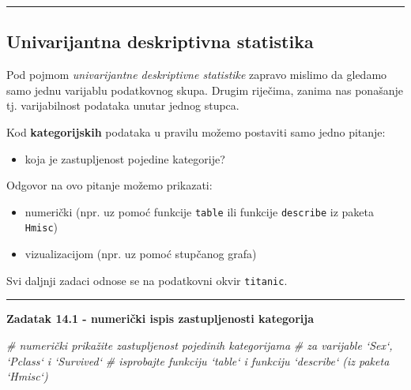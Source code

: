 \documentclass[]{book}
\newenvironment{Shaded}{\begin{snugshade}}{\end{snugshade}}
\newcommand{\CommentTok}[1]{\textcolor[rgb]{0.56,0.35,0.01}{\textit{#1}}}
\providecommand{\tightlist}{%
  \setlength{\itemsep}{0pt}\setlength{\parskip}{0pt}}
\theoremstyle{definition}
\theoremstyle{definition}
\theoremstyle{definition}
\theoremstyle{remark}
\begin{document}
\begin{center}\rule{0.5\linewidth}{\linethickness}\end{center}

\subsection{Univarijantna deskriptivna
statistika}\label{univarijantna-deskriptivna-statistika}

Pod pojmom \emph{univarijantne deskriptivne statistike} zapravo mislimo
da gledamo samo jednu varijablu podatkovnog skupa. Drugim riječima,
zanima nas ponašanje tj. varijabilnost podataka unutar jednog stupca.

Kod \textbf{kategorijskih} podataka u pravilu možemo postaviti samo
jedno pitanje:

\begin{itemize}
\tightlist
\item
  koja je zastupljenost pojedine kategorije?
\end{itemize}

Odgovor na ovo pitanje možemo prikazati:

\begin{itemize}
\tightlist
\item
  numerički (npr. uz pomoć funkcije \texttt{table} ili funkcije
  \texttt{describe} iz paketa \texttt{Hmisc})
\item
  vizualizacijom (npr. uz pomoć stupčanog grafa)
\end{itemize}

Svi daljnji zadaci odnose se na podatkovni okvir \texttt{titanic}.

\begin{center}\rule{0.5\linewidth}{\linethickness}\end{center}

\textbf{Zadatak 14.1 - numerički ispis zastupljenosti kategorija}

\begin{Shaded}
\begin{Highlighting}[]
\CommentTok{# numerički prikažite zastupljenost pojedinih kategorijama}
\CommentTok{# za varijable `Sex`,  `Pclass` i `Survived`}
\CommentTok{# isprobajte funkciju `table` i funkciju `describe` (iz paketa `Hmisc`)}
\end{Highlighting}
\end{Shaded}
\end{document}
